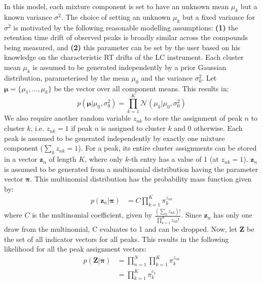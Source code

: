 In this model, each mixture component is set to have an unknown mean $\mu_{k}$ but a known variance $\sigma^2$. The choice of setting an unknown $\mu_k$ but a fixed variance for $\sigma^2$ is motivated by the following reasonable modelling assumptions: \textbf{(1)} the retention time drift of observed peaks is broadly similar across the compounds being measured, and \textbf{(2)} this parameter can be set by the user based on his knowledge on the characteristic RT drifts of the LC instrument. Each cluster mean $\mu_k$ is assumed to be generated independently by a prior Gaussian distribution, parameterised by the mean $\mu_0$ and the variance $\sigma^2_0$. Let $\boldsymbol{\mu}=\{\mu_{1},...,\mu_{k}\}$ be the vector over all component means. This results in:
\begin{equation}
p(\boldsymbol{\mu} \vert \mu_0, \sigma^2_0) = \prod_{k=1}^K \mathcal{N}(\mu_k \vert \mu_0, \sigma^2_0)
\label{eq:background-prior-gaussian}
\end{equation}
We also require another random variable $z_{nk}$ to store the assignment of peak $n$ to cluster $k$, i.e. $z_{nk}=1$ if peak $n$ is assigned to cluster $k$ and 0 otherwise. Each peak is assumed to be generated independently by exactly one mixture component ($\sum_{k} z_{nk} = 1$). For a peak, its entire cluster assignments can be stored in a vector $\boldsymbol{z}_{n}$ of length $K$, where only $k$-th entry has a value of 1 (at $z_{nk}=1$). $\boldsymbol{z}_{n}$ is assumed to be generated from a multinomial distribution having the parameter vector $\boldsymbol{\pi}$. This multinomial distribution has the probability mass function given by:
\begin{equation}
\begin{aligned}
p(\boldsymbol{z}_n \vert \boldsymbol{\pi}) &= C \prod_{k=1}^{K} \pi_k^{z_{nk}}
\end{aligned}
\label{eq:background-zn_pmf}
\end{equation}
where $C$ is the multinomial coefficient, given by $\frac{(\sum_k z_{nk})!}{\prod_{k=1}^K z_{nk}!}$. Since $\boldsymbol{z}_{n}$ has only one draw from the multinomial, C evaluates to 1 and can be dropped. Now, let $\boldsymbol{Z}$ be the set of all indicator vectors for all peaks. This results in the following likelihood for all the peak assignment vectors:
\begin{equation}
\begin{aligned}
p(\boldsymbol{Z} \vert \boldsymbol{\pi}) &= \prod_{n=1}^N \prod_{k=1}^{K} \pi_k^{z_{nk}} \\
                                                              &= \prod_{k=1}^{K} \pi_k^{c_{k}}
\end{aligned}
\label{eq:background-z-given-pi}
\end{equation}
